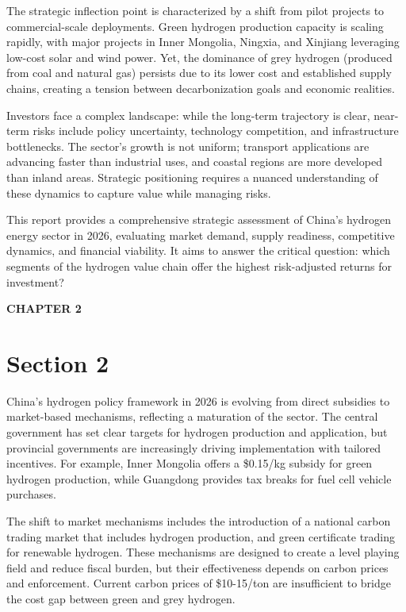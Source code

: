 \documentclass[10.5pt,a4paper]{article}
\newcommand{\kicker}[1]{\textcolor{BOBlue}{\scriptsize\bfseries\MakeUppercase{#1}}\\[-2pt]}
\begin{document}
{\small The strategic inflection point is characterized by a shift from pilot projects to commercial-scale deployments. Green hydrogen production capacity is scaling rapidly, with major projects in Inner Mongolia, Ningxia, and Xinjiang leveraging low-cost solar and wind power. Yet, the dominance of grey hydrogen (produced from coal and natural gas) persists due to its lower cost and established supply chains, creating a tension between decarbonization goals and economic realities.}

{\small Investors face a complex landscape: while the long-term trajectory is clear, near-term risks include policy uncertainty, technology competition, and infrastructure bottlenecks. The sector's growth is not uniform; transport applications are advancing faster than industrial uses, and coastal regions are more developed than inland areas. Strategic positioning requires a nuanced understanding of these dynamics to capture value while managing risks.}

{\small This report provides a comprehensive strategic assessment of China's hydrogen energy sector in 2026, evaluating market demand, supply readiness, competitive dynamics, and financial viability. It aims to answer the critical question: which segments of the hydrogen value chain offer the highest risk-adjusted returns for investment?}




\Needspace{55mm}
\kicker{Chapter 2}
\section*{Section 2}

{\small China's hydrogen policy framework in 2026 is evolving from direct subsidies to market-based mechanisms, reflecting a maturation of the sector. The central government has set clear targets for hydrogen production and application, but provincial governments are increasingly driving implementation with tailored incentives. For example, Inner Mongolia offers a \$0.15/kg subsidy for green hydrogen production, while Guangdong provides tax breaks for fuel cell vehicle purchases.}

{\small The shift to market mechanisms includes the introduction of a national carbon trading market that includes hydrogen production, and green certificate trading for renewable hydrogen. These mechanisms are designed to create a level playing field and reduce fiscal burden, but their effectiveness depends on carbon prices and enforcement. Current carbon prices of \$10-15/ton are insufficient to bridge the cost gap between green and grey hydrogen.}
\end{document}
